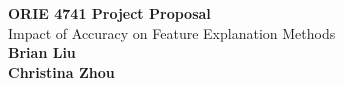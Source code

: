 \documentclass{article}
\begin{document}
	\begin{center}
    
    
		\LARGE{\textbf{ORIE 4741 Project Proposal}} \\
        \vspace{1em}
        \Large{Impact of  Accuracy on Feature Explanation Methods} \\
        \vspace{1em}
        \normalsize\textbf{Brian Liu} \\
        \vspace{1em}
        \normalsize\textbf{Christina Zhou} \\
        
     
     
	\end{center}
\end{document}
